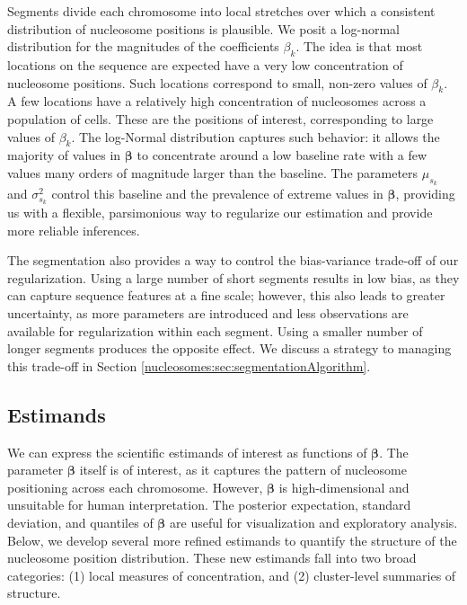 Segments divide each chromosome into local stretches over which a consistent distribution of nucleosome positions is plausible.
%
We posit a log-normal distribution for the magnitudes of the coefficients $\beta_k$.
The idea is that most locations on the sequence are expected have a very low concentration of nucleosome positions.
Such locations correspond to small, non-zero values of $\beta_k$.
A few locations have a relatively high concentration of nucleosomes across a population of cells.
These are the positions of interest, corresponding to large values of $\beta_k$.
The log-Normal distribution captures such behavior: it allows the majority of values in $\bm \beta$ to concentrate around a low baseline rate with a few values many orders of magnitude larger than the baseline.
The parameters $\mu_{s_k}$ and $\sigma^2_{s_k}$ control this baseline and the prevalence of extreme values in $\bm \beta$, providing us with a flexible, parsimonious way to regularize our estimation and provide more reliable inferences.

The segmentation also provides a way to control the bias-variance trade-off of our regularization.
Using a large number of short segments results in low bias, as they can capture sequence features at a fine scale; however, this also leads to greater uncertainty, as more parameters are introduced and less observations are available for regularization within each segment.
Using a smaller number of longer segments produces the opposite effect.
We discuss a strategy to managing this trade-off in Section \ref{nucleosomes:sec:segmentationAlgorithm}.


\subsection{Estimands}
\label{nucleosomes:sec:estimands}

We can express the scientific estimands of interest as functions of $\bm \beta$.
The parameter $\bm \beta$ itself is of interest, as it captures the pattern of nucleosome positioning across each chromosome. However, $\bm \beta$ is  high-dimensional and unsuitable for human interpretation. 
The posterior expectation, standard deviation, and quantiles of $\bm \beta$ are useful for visualization and exploratory analysis.
Below, we develop several more refined estimands to quantify the structure of the nucleosome position distribution.
These new estimands fall into two broad categories:
 (1) local measures of concentration, and
 (2) cluster-level summaries of structure.

